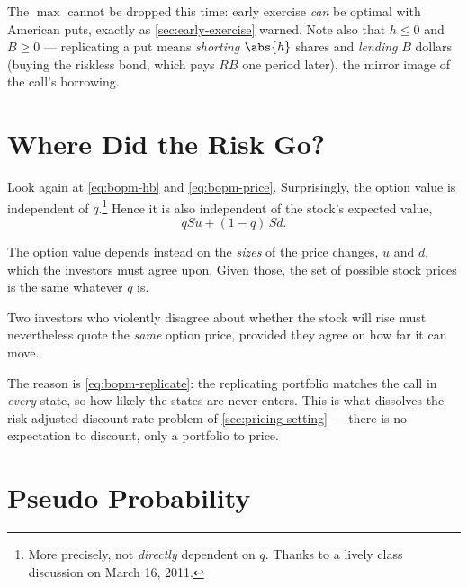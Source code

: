 \begin{note}
	The $\max$ cannot be dropped this time: early exercise \emph{can} be optimal with American puts, exactly as \autoref{sec:early-exercise} warned.
	\suppstart
	Note also that $h\le 0$ and $B\ge 0$ --- replicating a put means \emph{shorting} $\abs{h}$ shares and \emph{lending} $B$ dollars (buying the riskless bond, which pays $RB$ one period later), the mirror image of the call's borrowing.
	\suppend
\end{note}

\section{Where Did the Risk Go?}
\label{sec:bopm-risk}


\suppstart
Look again at \eqref{eq:bopm-hb} and \eqref{eq:bopm-price}.
\suppend
Surprisingly, the option value is independent of $q$.\footnote{More precisely, not \emph{directly} dependent on $q$. Thanks to a lively class discussion on March 16, 2011.}
Hence it is also independent of the stock's expected value,
\[
	qSu+(1-q)\,Sd .
\]

The option value depends instead on the \emph{sizes} of the price changes, $u$ and $d$, which the investors must agree upon.
Given those, the set of possible stock prices is the same whatever $q$ is.

\suppstart
\begin{moral}
	Two investors who violently disagree about whether the stock will rise must nevertheless quote the \emph{same} option price, provided they agree on how far it can move.

	The reason is \eqref{eq:bopm-replicate}: the replicating portfolio matches the call in \emph{every} state, so how likely the states are never enters.
	This is what dissolves the risk-adjusted discount rate problem of \autoref{sec:pricing-setting} --- there is no expectation to discount, only a portfolio to price.
\end{moral}
\suppend

\section{Pseudo Probability}
\label{sec:pseudo-prob}

